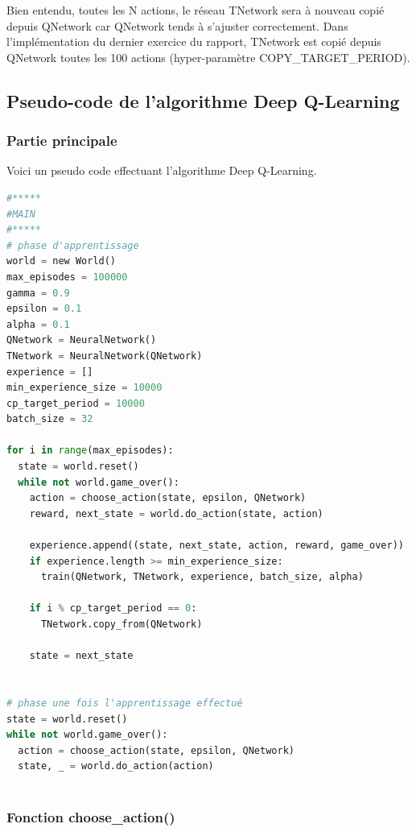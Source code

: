 \documentclass[11pt,a4paper]{report}
\begin{document}
    \par Bien entendu, toutes les N actions, le réseau TNetwork sera à nouveau copié depuis QNetwork car QNetwork tends à s'ajuster correctement. Dans l'implémentation du dernier exercice du rapport, TNetwork est copié depuis QNetwork toutes les 100 actions (hyper-paramètre COPY\_TARGET\_PERIOD). 
    
   \subsection{Pseudo-code de l'algorithme Deep Q-Learning} 
   
   \subsubsection{Partie principale}
   
   \par Voici un pseudo code effectuant l'algorithme Deep Q-Learning. 
   
   \begin{lstlisting}[language=python]
#*****
#MAIN
#*****
# phase d'apprentissage
world = new World()
max_episodes = 100000
gamma = 0.9
epsilon = 0.1
alpha = 0.1
QNetwork = NeuralNetwork()
TNetwork = NeuralNetwork(QNetwork)
experience = []
min_experience_size = 10000
cp_target_period = 10000
batch_size = 32
  
for i in range(max_episodes):
  state = world.reset()
  while not world.game_over():
    action = choose_action(state, epsilon, QNetwork)
    reward, next_state = world.do_action(state, action)

    experience.append((state, next_state, action, reward, game_over)) 
    if experience.length >= min_experience_size:
      train(QNetwork, TNetwork, experience, batch_size, alpha)

    if i % cp_target_period == 0:
      TNetwork.copy_from(QNetwork)
        
    state = next_state
    
        
# phase une fois l'apprentissage effectué
state = world.reset()
while not world.game_over():
  action = choose_action(state, epsilon, QNetwork)
  state, _ = world.do_action(action)
        
  \end{lstlisting} 

   \subsubsection{Fonction choose\_action()}
\end{document}
